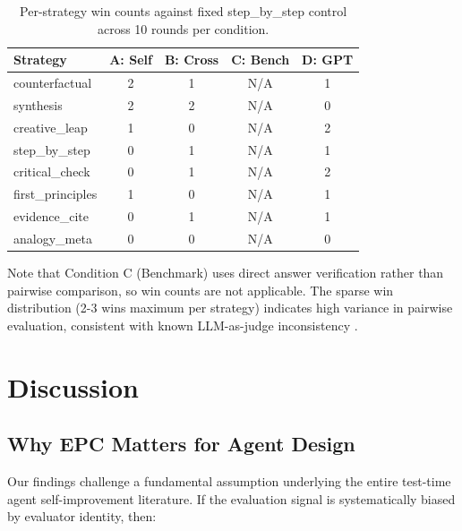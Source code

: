 \documentclass[11pt,a4paper]{article}
\begin{document}
\begin{table}[H]
\centering
\caption{Per-strategy win counts against fixed step\_by\_step control across 10 rounds per condition.}
\label{tab:wins}
\begin{tabular}{lcccc}
\toprule
\textbf{Strategy} & \textbf{A: Self} & \textbf{B: Cross} & \textbf{C: Bench} & \textbf{D: GPT} \\
\midrule
counterfactual  & 2 & 1 & N/A & 1 \\
synthesis       & 2 & 2 & N/A & 0 \\
creative\_leap  & 1 & 0 & N/A & 2 \\
step\_by\_step  & 0 & 1 & N/A & 1 \\
critical\_check & 0 & 1 & N/A & 2 \\
first\_principles & 1 & 0 & N/A & 1 \\
evidence\_cite  & 0 & 1 & N/A & 1 \\
analogy\_meta   & 0 & 0 & N/A & 0 \\
\bottomrule
\end{tabular}
\end{table}

Note that Condition C (Benchmark) uses direct answer verification rather than pairwise comparison, so win counts are not applicable. The sparse win distribution (2-3 wins maximum per strategy) indicates high variance in pairwise evaluation, consistent with known LLM-as-judge inconsistency \cite{zheng2023judging}.

\section{Discussion}

\subsection{Why EPC Matters for Agent Design}

Our findings challenge a fundamental assumption underlying the entire test-time agent self-improvement literature. If the evaluation signal is systematically biased by evaluator identity, then:
\end{document}
